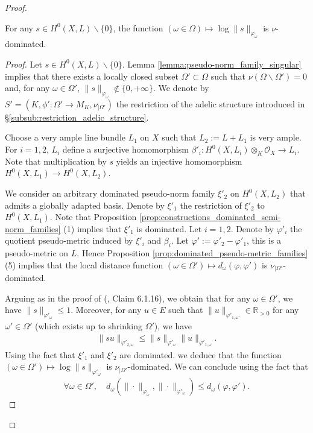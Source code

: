 \documentclass [11pt,reqno]{amsart}
\def\bR{{\mathbb{R}}}
\newcommand{\1}{\mathmybb{1}}
\def\cO{{\mathcal{O}}}
\def\setminus{\smallsetminus}
\begin{document}
\begin{proof}
\begin{claim}
\label{claim_2}
For any $s\in H^{0}(X,L)\setminus\{0\}$, the function $(\omega\in\Omega)\mapsto \log\|s\|_{\varphi_{\omega}}$ is $\nu$-dominated.
\end{claim}

\begin{proof}
Let $s\in H^{0}(X,L)\setminus\{0\}$. Lemma \ref{lemma:pseudo-norm_family_singular} implies that there exists a locally closed subset $\Omega'\subset \Omega$ such that $\nu(\Omega\setminus \Omega')=0$ and, for any $\omega\in\Omega'$, $\|s\|_{\varphi_{\omega}} \notin \{0,+\infty\}$. We denote by $S'=(K,\phi':\Omega' \to M_K,\nu_{|\Omega'})$ the restriction of the adelic structure introduced in \S \ref{subsub:restriction_adelic_structure}. 

Choose a very ample line bundle $L_{1}$ on $X$ such that $L_2:=L+L_1$ is very ample. For $i=1,2$, $L_{i}$ define a surjective homomorphism $\beta'_{i} : H^{0}(X,L_{i})\otimes_{K}\cO_{X}\to L_{i}$. Note that multiplication by $s$ yields an injective homomorphism $H^{0}(X,L_{1})\to H^{0}(X,L_{2})$. 

We consider an arbitrary dominated pseudo-norm family $\xi'_{2}$ on $H^{0}(X,L_{2})$ that admits a globally adapted basis. Denote by $\xi'_{1}$ the restriction of $\xi'_{2}$ to $H^{0}(X,L_{1})$. Note that Proposition \ref{prop:constructions_dominated_semi-norm_families} (1) implies that $\xi'_{1}$ is dominated. Let $i=1,2$. Denote by $\varphi'_{i}$ the quotient pseudo-metric induced by $\xi'_{i}$ and $\beta_{i}$. Let $\varphi' := \varphi'_2-\varphi'_1$, this is a pseudo-metric on $L$. Hence Proposition \ref{prop:dominated_pseudo-metric_families} (5) implies that the local distance function $(\omega\in \Omega') \mapsto d_{\omega}(\varphi,\varphi')$ is $\nu_{|\Omega'}$-dominated. 

Arguing as in the proof of (\cite{ChenMori}, Claim 6.1.16), we obtain that for any $\omega\in\Omega'$, we have $\|s\|_{\varphi'_{\omega}}\leq 1$. Moreover, for any $u\in E$ such that $\|u\|_{\varphi'_{1,\omega'}}\in\bR_{>0}$ for any $\omega'\in\Omega'$  (which exists up to shrinking $\Omega'$), we have
\begin{align*}
\|su\|_{\varphi'_{2,\omega}} \leq \|s\|_{\varphi'_{\omega}} \|u\|_{\varphi'_{1,\omega}}. 
\end{align*}
Using the fact that $\xi'_{1}$ and $\xi'_{2}$ are dominated. we deduce that the function $(\omega\in\Omega')\mapsto \log\|s\|_{\varphi'_{\omega}}$ is $\nu_{|\Omega'}$-dominated. We can conclude using the fact that
\begin{align*}
\forall \omega\in\Omega', \quad d_{\omega}(\|\cdot\|_{\varphi_{\omega}},\|\cdot\|_{\varphi'_{\omega}})\leq d_{\omega}(\varphi,\varphi').
\end{align*}
\end{proof}


\end{proof}
\end{document}
